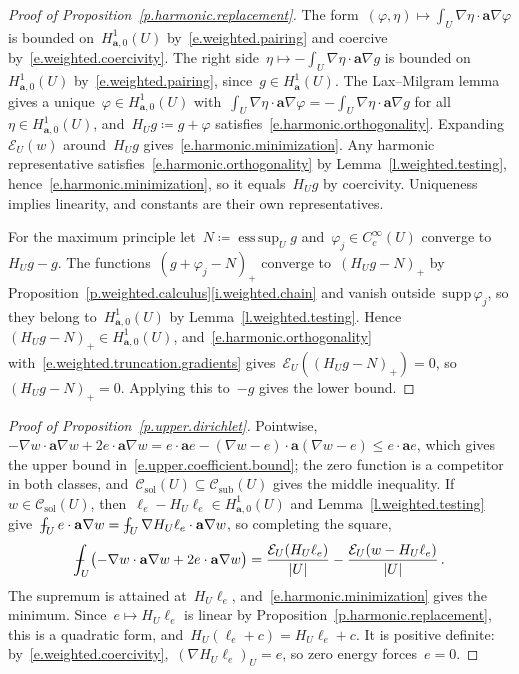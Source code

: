 \documentclass[11pt,letterpaper]{article}
\numberwithin{equation}{section}
\theoremstyle{definition}
\renewcommand{\a}{\mathbf{a}}
\newcommand*{\supp}{\mathrm{supp\,}}
\DeclareMathOperator*{\esssup}{ess\,sup}
\newcommand{\Ener}{\mathcal E}
\newcommand{\Hzero}[1]{H^1_{#1,0}}
\newcommand{\Csol}{\mathcal C_{\mathrm{sol}}}
\newcommand{\Csub}{\mathcal C_{\mathrm{sub}}}
\def\Xint#1{\mathchoice
	{\XXint\displaystyle\textstyle{#1}}%
	{\XXint\textstyle\scriptstyle{#1}}%
	{\XXint\scriptstyle\scriptscriptstyle{#1}}%
	{\XXint\scriptscriptstyle\scriptscriptstyle{#1}}%
	\!\int}
\def\XXint#1#2#3{{\setbox0=\hbox{$#1{#2#3}{\int}$}
		\vcenter{\hbox{$#2#3$}}\kern-.5\wd0}}
\def\fint{\Xint-}
\begin{document}
\begin{proof}[Proof of Proposition~\ref{p.harmonic.replacement}]
The form~$(\varphi,\eta)\mapsto\int_U\nabla\eta\cdot\a\nabla\varphi$ is bounded on~$\Hzero{\a}(U)$ by~\eqref{e.weighted.pairing} and coercive by~\eqref{e.weighted.coercivity}. The right side~$\eta\mapsto-\int_U\nabla\eta\cdot\a\nabla g$ is bounded on~$\Hzero{\a}(U)$ by~\eqref{e.weighted.pairing}, since~$g\in H^1_\a(U)$. The Lax--Milgram lemma~\cite[Lemma 25.2]{Ern.Guermond.hilbert} gives a unique~$\varphi\in\Hzero{\a}(U)$ with~$\int_U\nabla\eta\cdot\a\nabla\varphi=-\int_U\nabla\eta\cdot\a\nabla g$ for all~$\eta\in\Hzero{\a}(U)$, and~$H_Ug\coloneqq g+\varphi$ satisfies~\eqref{e.harmonic.orthogonality}. Expanding~$\Ener_U(w)$ around~$H_Ug$ gives~\eqref{e.harmonic.minimization}. Any harmonic representative satisfies~\eqref{e.harmonic.orthogonality} by Lemma~\ref{l.weighted.testing}, hence~\eqref{e.harmonic.minimization}, so it equals~$H_Ug$ by coercivity. Uniqueness implies linearity, and constants are their own representatives.

\smallskip

For the maximum principle let~$N\coloneqq\esssup_Ug$ and~$\varphi_j\in C^\infty_c(U)$ converge to~$H_Ug-g$. The functions~$(g+\varphi_j-N)_+$ converge to~$(H_Ug-N)_+$ by Proposition~\ref{p.weighted.calculus}\ref{i.weighted.chain} and vanish outside~$\supp\varphi_j$, so they belong to~$\Hzero{\a}(U)$ by Lemma~\ref{l.weighted.testing}. Hence~$(H_Ug-N)_+\in\Hzero{\a}(U)$, and~\eqref{e.harmonic.orthogonality} with~\eqref{e.weighted.truncation.gradients} gives~$\Ener_U((H_Ug-N)_+)=0$, so~$(H_Ug-N)_+=0$. Applying this to~$-g$ gives the lower bound.
\end{proof}

\begin{proof}[Proof of Proposition~\ref{p.upper.dirichlet}]
Pointwise,~$-\nabla w\cdot\a\nabla w+2e\cdot\a\nabla w=e\cdot\a e-(\nabla w-e)\cdot\a(\nabla w-e)\leq e\cdot\a e$, which gives the upper bound in~\eqref{e.upper.coefficient.bound}; the zero function is a competitor in both classes, and~$\Csol(U)\subseteq\Csub(U)$ gives the middle inequality. If~$w\in\Csol(U)$, then~$\ell_e-H_U\ell_e\in\Hzero{\a}(U)$ and Lemma~\ref{l.weighted.testing} give~$\fint_Ue\cdot\a\nabla w=\fint_U\nabla H_U\ell_e\cdot\a\nabla w$, so completing the square,
\begin{equation*}
	\fint_U\bigl(-\nabla w\cdot\a\nabla w+2e\cdot\a\nabla w\bigr)=\frac{\Ener_U(H_U\ell_e)}{|U|}-\frac{\Ener_U(w-H_U\ell_e)}{|U|}\,.
\end{equation*}
The supremum is attained at~$H_U\ell_e$, and~\eqref{e.harmonic.minimization} gives the minimum. Since~$e\mapsto H_U\ell_e$ is linear by Proposition~\ref{p.harmonic.replacement}, this is a quadratic form, and~$H_U(\ell_e+c)=H_U\ell_e+c$. It is positive definite: by~\eqref{e.weighted.coercivity},~$(\nabla H_U\ell_e)_U=e$, so zero energy forces~$e=0$.
\end{proof}
\end{document}
